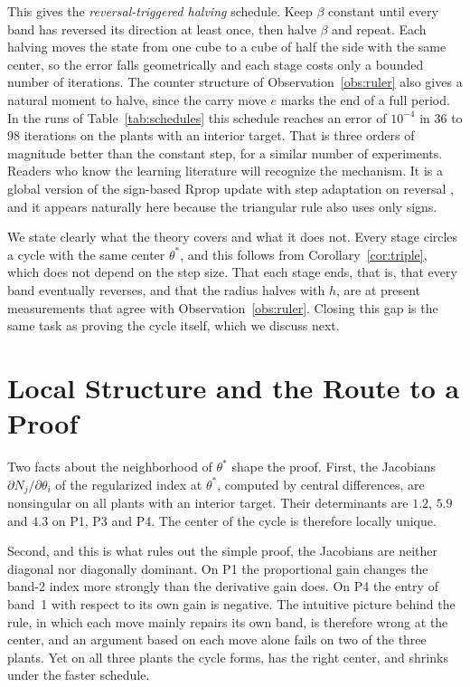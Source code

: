 \documentclass[letterpaper, 10pt, conference, twocolumn]{ieeeconf}
\begin{document}
This gives the \emph{reversal-triggered halving} schedule. Keep $\beta$
constant until every band has reversed its direction at least once, then halve
$\beta$ and repeat. Each halving moves the state from one cube to a cube of
half the side with the same center, so the error falls geometrically and each
stage costs only a bounded number of iterations. The counter structure of
Observation~\ref{obs:ruler} also gives a natural moment to halve, since the
carry move $e$ marks the end of a full period. In the runs of
Table~\ref{tab:schedules} this schedule reaches an error of $10^{-4}$ in $36$
to $98$ iterations on the plants with an interior target. That is three orders
of magnitude better than the constant step, for a similar number of
experiments. Readers who know the learning literature will recognize the
mechanism. It is a global version of the sign-based Rprop update with
step adaptation on reversal \cite{Riedmiller1993}, and it appears naturally
here because the triangular rule also uses only signs.

We state clearly what the theory covers and what it does not. Every stage
circles a cycle with the same center $\theta^*$, and this follows from
Corollary~\ref{cor:triple}, which does not depend on the step size. That each
stage ends, that is, that every band eventually reverses, and that the radius
halves with $h$, are at present measurements that agree with
Observation~\ref{obs:ruler}. Closing this gap is the same task as proving the
cycle itself, which we discuss next.

\section{Local Structure and the Route to a Proof}
\label{sec:structure}

Two facts about the neighborhood of $\theta^*$ shape the proof. First, the
Jacobians $\partial N_j / \partial \theta_i$ of the regularized index at
$\theta^*$, computed by central differences, are nonsingular on all plants with
an interior target. Their determinants are $1.2$, $5.9$ and $4.3$ on P1, P3 and
P4. The center of the cycle is therefore locally unique.

Second, and this is what rules out the simple proof, the Jacobians are
neither diagonal nor diagonally dominant. On P1 the proportional gain changes
the band-2 index more strongly than the derivative gain does. On P4 the entry
of band~1 with respect to its own gain is negative. The intuitive picture
behind the rule, in which each move mainly repairs its own band, is therefore
wrong at the center, and an argument based on each move alone fails on two of
the three plants. Yet on all three plants the cycle forms, has the right
center, and shrinks under the faster schedule.
\end{document}
